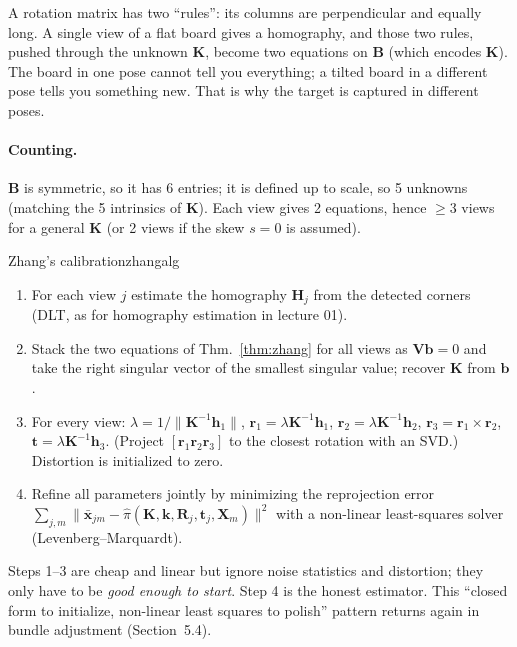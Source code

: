 \documentclass[11pt,a4paper]{article}
\newcommand{\xb}{\bar{\bm{x}}}      %
\newcommand{\norm}[1]{\lVert #1\rVert}
\begin{document}
\begin{intuition}
A rotation matrix has two ``rules'': its columns are perpendicular and equally long. A single view of a
flat board gives a homography, and those two rules, pushed through the unknown $\bm K$, become two
equations on $\bm B$ (which encodes $\bm K$). The board in one pose cannot tell you everything; a tilted
board in a different pose tells you something new. That is why the target is captured in different poses.
\end{intuition}

\paragraph{Counting.} $\bm B$ is symmetric, so it has 6 entries; it is defined up to scale, so 5 unknowns
(matching the 5 intrinsics of $\bm K$). Each view gives 2 equations, hence $\ge 3$ views for a general $\bm K$ (or 2 views
if the skew $s=0$ is assumed).

\begin{algorithm}{Zhang's calibration}{zhangalg}
\begin{enumerate}[nosep]
\item For each view $j$ estimate the homography $\bm H_j$ from the detected corners (DLT, as for homography
 estimation in lecture 01).
\item Stack the two equations of Thm.~\ref{thm:zhang} for all views as $\bm V\bm b=0$ and take the right singular
 vector of the smallest singular value; recover $\bm K$ from $\bm b$.
\item For every view: $\lambda=1/\norm{\bm K^{-1}\bm h_1}$, $\bm r_1=\lambda\bm K^{-1}\bm h_1$,
 $\bm r_2=\lambda\bm K^{-1}\bm h_2$, $\bm r_3=\bm r_1\times\bm r_2$, $\bm t=\lambda\bm K^{-1}\bm h_3$.
 (Project $[\bm r_1\bm r_2\bm r_3]$ to the closest rotation with an SVD.) Distortion is initialized to zero.
\item Refine all parameters jointly by minimizing the reprojection error
 $\sum_{j,m}\norm{\xb_{jm}-\hat\pi(\bm K,\bm k,\bm R_j,\bm t_j,\bm X_m)}^2$ with a non-linear least-squares solver
 (Levenberg--Marquardt).
\end{enumerate}
\end{algorithm}

\begin{intuition}
Steps 1--3 are cheap and linear but ignore noise statistics and distortion; they only have to be
\emph{good enough to start}. Step 4 is the honest estimator. This ``closed form to initialize, non-linear
least squares to polish'' pattern returns again in bundle adjustment (Section~5.4).
\end{intuition}
\end{document}
